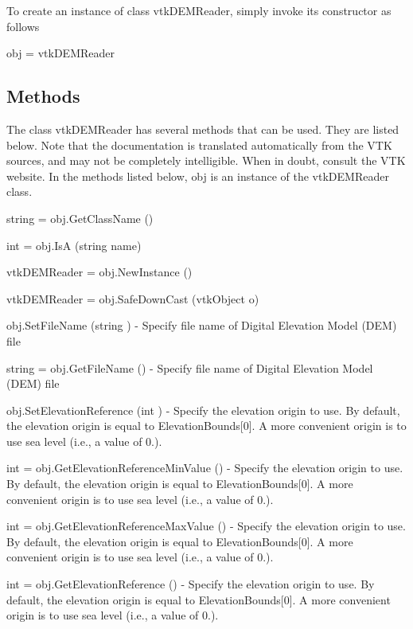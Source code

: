 To create an instance of class vtk\-D\-E\-M\-Reader, simply invoke its constructor as follows \begin{DoxyVerb}  obj = vtkDEMReader
\end{DoxyVerb}
 \hypertarget{vtkwidgets_vtkxyplotwidget_Methods}{}\subsection{Methods}\label{vtkwidgets_vtkxyplotwidget_Methods}
The class vtk\-D\-E\-M\-Reader has several methods that can be used. They are listed below. Note that the documentation is translated automatically from the V\-T\-K sources, and may not be completely intelligible. When in doubt, consult the V\-T\-K website. In the methods listed below, {\ttfamily obj} is an instance of the vtk\-D\-E\-M\-Reader class. 
\begin{DoxyItemize}
\item {\ttfamily string = obj.\-Get\-Class\-Name ()}  
\item {\ttfamily int = obj.\-Is\-A (string name)}  
\item {\ttfamily vtk\-D\-E\-M\-Reader = obj.\-New\-Instance ()}  
\item {\ttfamily vtk\-D\-E\-M\-Reader = obj.\-Safe\-Down\-Cast (vtk\-Object o)}  
\item {\ttfamily obj.\-Set\-File\-Name (string )} -\/ Specify file name of Digital Elevation Model (D\-E\-M) file  
\item {\ttfamily string = obj.\-Get\-File\-Name ()} -\/ Specify file name of Digital Elevation Model (D\-E\-M) file  
\item {\ttfamily obj.\-Set\-Elevation\-Reference (int )} -\/ Specify the elevation origin to use. By default, the elevation origin is equal to Elevation\-Bounds\mbox{[}0\mbox{]}. A more convenient origin is to use sea level (i.\-e., a value of 0.).  
\item {\ttfamily int = obj.\-Get\-Elevation\-Reference\-Min\-Value ()} -\/ Specify the elevation origin to use. By default, the elevation origin is equal to Elevation\-Bounds\mbox{[}0\mbox{]}. A more convenient origin is to use sea level (i.\-e., a value of 0.).  
\item {\ttfamily int = obj.\-Get\-Elevation\-Reference\-Max\-Value ()} -\/ Specify the elevation origin to use. By default, the elevation origin is equal to Elevation\-Bounds\mbox{[}0\mbox{]}. A more convenient origin is to use sea level (i.\-e., a value of 0.).  
\item {\ttfamily int = obj.\-Get\-Elevation\-Reference ()} -\/ Specify the elevation origin to use. By default, the elevation origin is equal to Elevation\-Bounds\mbox{[}0\mbox{]}. A more convenient origin is to use sea level (i.\-e., a value of 0.).  

\end{DoxyItemize}
